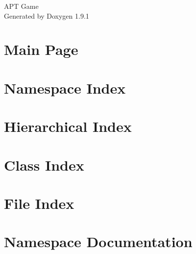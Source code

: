 \let\mypdfximage\pdfximage\def\pdfximage{\immediate\mypdfximage}\documentclass[twoside]{book}
\newcommand{\+}{\discretionary{\mbox{\scriptsize$\hookleftarrow$}}{}{}}
\newcommand{\clearemptydoublepage}{%
  \newpage{\pagestyle{empty}\cleardoublepage}%
}
\begin{document}
\raggedbottom

\hypersetup{pageanchor=false,
             bookmarksnumbered=true,
             pdfencoding=unicode
            }
\begin{titlepage}
\vspace*{7cm}
\begin{center}%
{\Large APT Game }\\
\vspace*{1cm}
{\large Generated by Doxygen 1.9.1}\\
\end{center}
\end{titlepage}
\clearemptydoublepage
{}
\tableofcontents
\clearemptydoublepage
{}
\hypersetup{pageanchor=true}

\chapter{Main Page}
\label{index}\hypertarget{index}{}
\chapter{Namespace Index}

\chapter{Hierarchical Index}

\chapter{Class Index}

\chapter{File Index}

\chapter{Namespace Documentation}


\end{document}
